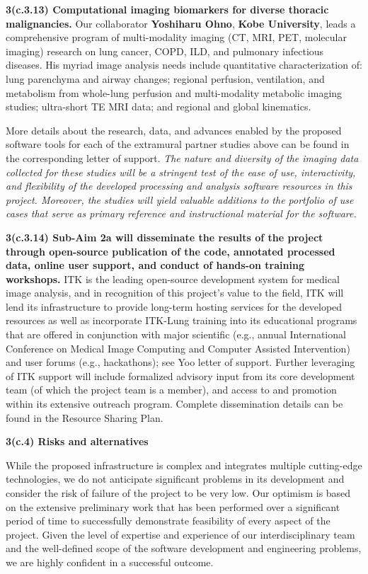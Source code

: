 \documentclass[11pt,]{article}
\begin{document}
\textbf{3(c.3.13) Computational imaging biomarkers for diverse thoracic
malignancies.} Our collaborator \textbf{Yoshiharu Ohno}, \textbf{Kobe
University}, leads a comprehensive program of multi-modality imaging
(CT, MRI, PET, molecular imaging) research on lung cancer, COPD, ILD,
and pulmonary infectious diseases. His myriad image analysis needs
include quantitative characterization of: lung parenchyma and airway
changes; regional perfusion, ventilation, and metabolism from whole-lung
perfusion and multi-modality metabolic imaging studies; ultra-short TE
MRI data; and regional and global kinematics.

More details about the research, data, and advances enabled by the
proposed software tools for each of the extramural partner studies above
can be found in the corresponding letter of support. \emph{The nature
and diversity of the imaging data collected for these studies will be a
stringent test of the ease of use, interactivity, and flexibility of the
developed processing and analysis software resources in this project.
Moreover, the studies will yield valuable additions to the portfolio of
use cases that serve as primary reference and instructional material for
the software.}

\textbf{3(c.3.14) Sub-Aim 2a will disseminate the results of the project
through open-source publication of the code, annotated processed data,
online user support, and conduct of hands-on training workshops.} ITK is
the leading open-source development system for medical image analysis,
and in recognition of this project's value to the field, ITK will lend
its infrastructure to provide long-term hosting services for the
developed resources as well as incorporate ITK-Lung training into its
educational programs that are offered in conjunction with major
scientific (e.g., annual International Conference on Medical Image
Computing and Computer Assisted Intervention) and user forums (e.g.,
hackathons); see Yoo letter of support. Further leveraging of ITK
support will include formalized advisory input from its core development
team (of which the project team is a member), and access to and
promotion within its extensive outreach program. Complete dissemination
details can be found in the Resource Sharing Plan.

\textbf{3(c.4) Risks and alternatives}

While the proposed infrastructure is complex and integrates multiple
cutting-edge technologies, we do not anticipate significant problems in
its development and consider the risk of failure of the project to be
very low. Our optimism is based on the extensive preliminary work that
has been performed over a significant period of time to successfully
demonstrate feasibility of every aspect of the project. Given the level
of expertise and experience of our interdisciplinary team and the
well-defined scope of the software development and engineering problems,
we are highly confident in a successful outcome.
\end{document}
